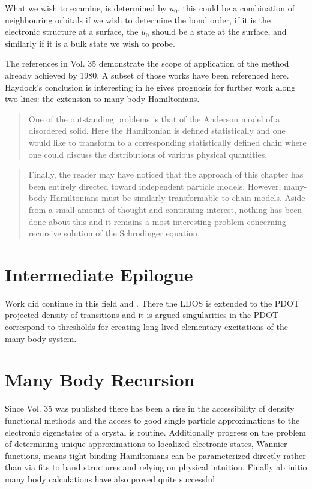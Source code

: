 \documentclass{article}
\begin{document}
What we wish to examine, is determined by $u_{0}$, this could be a combination
of neighbouring orbitals if we wish to determine the bond order, if it is the electronic
structure at a surface, the $u_{0}$ should be a state at the surface, and similarly if it
is a bulk state we wish to probe.

The references in Vol. 35 demonstrate the scope of application of the method 
already achieved by 1980. A subset of those works have been referenced here. 
Haydock's conclusion is interesting in he gives prognosis for further work
along two lines: the extension to many-body Hamiltonians.

\begin{quote}
One of the outstanding problems is that of the Anderson model
of a disordered solid. Here the Hamiltonian is defined statistically and
one would like to transform to a corresponding statistically defined chain where
one could discuss the distributions of various physical quantities.
\end{quote}

\begin{quote}
  Finally, the reader may have noticed that the approach of this chapter has been entirely directed
toward independent particle models. However, many-body Hamiltonians must be similarly 
transformable to chain models. Aside from a small amount of thought and continuing interest, 
nothing has been done about this and it remains a most interesting problem concerning recursive 
solution of the Schrodinger equation.
\end{quote}

\section{Intermediate Epilogue}
Work did continue in this field and \cite{annett94}. There the LDOS is extended
to the PDOT projected density of transitions and it is argued singularities
in the PDOT correspond to thresholds for creating long lived elementary excitations 
of the many body system.

\section{Many Body Recursion}


\label{sec:manybodyrecursion}
	Since Vol. 35 was published there has been a rise in the accessibility of density functional methods 
and the access to good single particle approximations to the electronic eigenstates of a crystal
is routine. Additionally progress on the problem of determining unique approximations to localized
electronic states, Wannier functions, means tight binding Hamiltonians can be parameterized directly
rather than via fits to band structures and relying on physical intuition. Finally ab initio many body
calculations have also proved quite successful
\end{document}
